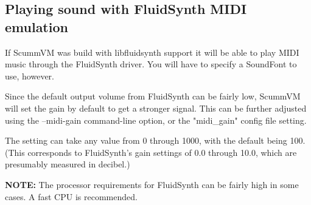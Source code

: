 \subsection{Playing sound with FluidSynth MIDI emulation}

If ScummVM was build with libfluidsynth support it will be able to play MIDI
music through the FluidSynth driver. You will have to specify a SoundFont to
use, however.

Since the default output volume from FluidSynth can be fairly low, ScummVM will
set the gain by default to get a stronger signal. This can be further adjusted
using the --midi-gain command-line option, or the "midi\_gain" config file
setting.

The setting can take any value from 0 through 1000, with the default being 100.
(This corresponds to FluidSynth's gain settings of 0.0 through 10.0, which are
presumably measured in decibel.)

\textbf{NOTE:} The processor requirements for FluidSynth can be fairly high in
some cases. A fast CPU is recommended.


